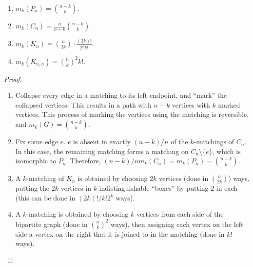 	\begin{fprop}
		\phantom{pain}
		\begin{enumerate}
			\item $m_k(P_n) = \binom{n-k}{k}$.
			\item $m_k(C_n) = \frac{n}{n-k} \binom{n-k}{k}$.
			\item $m_k(K_n) = \binom{n}{2k} \cdot \frac{(2k)!}{2^kk!}$.
			\item $m_k(K_{n,n}) = \binom{n}{k}^2 k!$.
		\end{enumerate}
	\end{fprop}
	\begin{proof}
		\phantom{pain}
		\begin{enumerate}
			\item Collapse every edge in a matching to its left endpoint, and ``mark'' the collapsed vertices. This results in a path with $n-k$ vertices with $k$ marked vertices. This process of marking the vertices using the matching is reversible, and $m_k(G) = \binom{n-k}{k}$.
			\item Fix some edge $e$. $e$ is absent in exactly $(n-k)/n$ of the $k$-matchings of $C_n$. In this case, the remaining matching forms a matching on $C_n \setminus \{e\}$, which is isomorphic to $P_n$. Therefore, $(n-k)/n m_k(C_n) = m_k(P_n) = \binom{n-k}{k}$.
			\item A $k$-matching of $K_n$ is obtained by choosing $2k$ vertices (done in $\binom{n}{2k}$) ways, putting the $2k$ vertices in $k$ indistinguishable ``boxes'' by putting $2$ in each (this can be done in $(2k)!/k!2^k$ ways).
			\item A $k$-matching is obtained by choosing $k$ vertices from each side of the bipartite graph (done in $\binom{n}{k}^2$ ways), then assigning each vertex on the left side a vertex on the right that it is joined to in the matching (done in $k!$ ways). \qedhere
		\end{enumerate}
	\end{proof}


